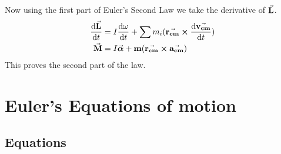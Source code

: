 \documentclass{article}
\begin{document}
Now using the first part of Euler's Second Law we take the derivative of $\va{L}$.
\begin{align*}
    \dv{\va{L}}{t} &= I\dv{\omega}{t} + \sum m_i(\va{r_{cm}} \cp\dv{\va{v_{cm}}}{t})\\
    \va{M} &= I\va*{\alpha} + \vb{m}(\va{r_{cm}} \cp\va{a_{cm}})\\
\end{align*}
This proves the second part of the law.


\newpage
\section{Euler's Equations of motion}
\subsection{Equations}
\end{document}
